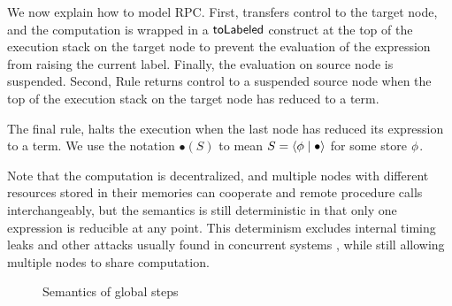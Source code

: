 We now explain how to model RPC. First,  transfers control to the target node, and the computation is wrapped in a $\mathsf{toLabeled}$ construct at the top of the execution stack on the target node to prevent the evaluation of the expression from raising the current label. Finally, the evaluation on source node is suspended. Second, Rule  returns control to a suspended source node when the top of the execution stack on the target node has reduced to a term.

The final rule,  halts the execution when the last node has reduced its expression to a term. We use the notation $\bullet(S)$ to mean $S = \langle \phi \mid \bullet \rangle$ for some store $\phi$.

Note that the computation is decentralized, and multiple nodes with different resources stored in their memories can cooperate and remote procedure calls interchangeably, but the semantics is still deterministic in that only one expression is reducible at any point. This determinism excludes internal timing leaks and other attacks usually found in concurrent systems \cite{Smith:1998:SIF:268946.268975, Muller:2012:TPS:2384616.2384621}, while still allowing multiple nodes to share computation.

\begin{figure}
\centering
{}
\caption{Semantics of global steps}
\label{fig:global-steps}
\end{figure}

